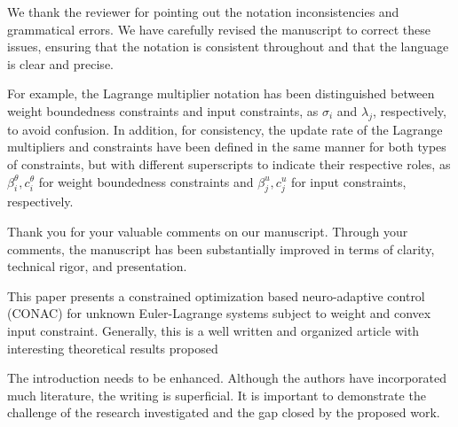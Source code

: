 \documentclass[12pt,english]{reviewresponse}
\begin{document}
\begin{revresponse}
	We thank the reviewer for pointing out the notation inconsistencies and grammatical errors. 
  We have carefully revised the manuscript to correct these issues, ensuring that the notation is consistent throughout and that the language is clear and precise.
  
  For example, the Lagrange multiplier notation has been distinguished between weight boundedness constraints and input constraints, as $\sigma_i$ and $\lambda_j$, respectively, to avoid confusion.
  In addition, for consistency, the update rate of the Lagrange multipliers and constraints have been defined in the same manner for both types of constraints, but with different superscripts to indicate their respective roles, as $\beta_i^\theta, c_i^\theta$ for weight boundedness constraints and $\beta_j^u, c_j^u$ for input constraints, respectively.

\end{revresponse}

\begin{concludingresponse}[]
	Thank you for your valuable comments on our manuscript. 
  Through your comments, the manuscript has been substantially improved in terms of clarity, technical rigor, and presentation.
\end{concludingresponse}

\reviewer
\begin{generalcomment}
	This paper presents a constrained optimization based neuro-adaptive control (CONAC) for unknown Euler-Lagrange systems subject to weight and convex input constraint. Generally, this is a well written and organized article with interesting theoretical results proposed
\end{generalcomment}

% 
\begin{revcomment}[1][1]{}
	The introduction needs to be enhanced. Although the authors have incorporated much literature, the writing is superficial. It is important to demonstrate the challenge of the research investigated and the gap closed by the proposed work.
\end{revcomment}
\end{document}
